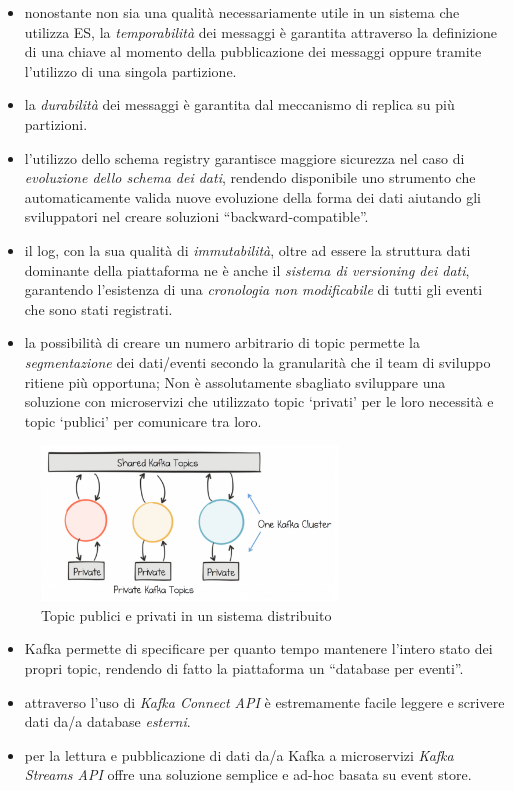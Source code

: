 \documentclass[]{article}
\providecommand{\tightlist}{%
  \setlength{\itemsep}{0pt}\setlength{\parskip}{0pt}}
\begin{document}
\begin{itemize}
\tightlist
\item
  nonostante non sia una qualità necessariamente utile in un sistema che
  utilizza ES, la \emph{temporabilità} dei messaggi è garantita
  attraverso la definizione di una chiave al momento della pubblicazione
  dei messaggi oppure tramite l'utilizzo di una singola partizione.
\item
  la \emph{durabilità} dei messaggi è garantita dal meccanismo di
  replica su più partizioni.
\item
  l'utilizzo dello schema registry garantisce maggiore sicurezza nel
  caso di \emph{evoluzione dello schema dei dati}, rendendo disponibile
  uno strumento che automaticamente valida nuove evoluzione della forma
  dei dati aiutando gli sviluppatori nel creare soluzioni
  ``backward-compatible''.
\item
  il log, con la sua qualità di \emph{immutabilità}, oltre ad essere la
  struttura dati dominante della piattaforma ne è anche il \emph{sistema
  di versioning dei dati}, garantendo l'esistenza di una
  \emph{cronologia non modificabile} di tutti gli eventi che sono stati
  registrati.
\item
  la possibilità di creare un numero arbitrario di topic permette la
  \emph{segmentazione} dei dati/eventi secondo la granularità che il
  team di sviluppo ritiene più opportuna; Non è assolutamente sbagliato
  sviluppare una soluzione con microservizi che utilizzato topic
  `privati' per le loro necessità e topic `publici' per comunicare tra
  loro.
\end{itemize}

\begin{figure}
\centering
\includegraphics[width=0.70000\textwidth]{../images/public-private-topics.png}
\caption{Topic publici e privati in un sistema distribuito
\label{figure_5}}
\end{figure}

\begin{itemize}
\tightlist
\item
  Kafka permette di specificare per quanto tempo mantenere l'intero
  stato dei propri topic, rendendo di fatto la piattaforma un ``database
  per eventi''.
\item
  attraverso l'uso di \emph{Kafka Connect API} è estremamente facile
  leggere e scrivere dati da/a database \emph{esterni}.
\item
  per la lettura e pubblicazione di dati da/a Kafka a microservizi
  \emph{Kafka Streams API} offre una soluzione semplice e ad-hoc basata
  su event store.
\end{itemize}
\end{document}
